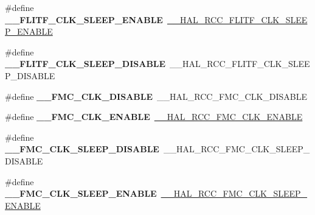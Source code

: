 \begin{DoxyCompactItemize}
\#define {\bfseries \+\_\+\+\_\+\+F\+L\+I\+T\+F\+\_\+\+C\+L\+K\+\_\+\+S\+L\+E\+E\+P\+\_\+\+E\+N\+A\+B\+LE}~\mbox{\hyperlink{group___r_c_c_ex___peripheral___clock___sleep___enable___disable_ga13e370f94b39c72876a321cdc5b31915}{\+\_\+\+\_\+\+H\+A\+L\+\_\+\+R\+C\+C\+\_\+\+F\+L\+I\+T\+F\+\_\+\+C\+L\+K\+\_\+\+S\+L\+E\+E\+P\+\_\+\+E\+N\+A\+B\+LE}}
\item 
\mbox{\label{group___h_a_l___r_c_c___aliased_ga3611eb96ece8835c54951f96d980ae95}} 
\#define {\bfseries \+\_\+\+\_\+\+F\+L\+I\+T\+F\+\_\+\+C\+L\+K\+\_\+\+S\+L\+E\+E\+P\+\_\+\+D\+I\+S\+A\+B\+LE}~\+\_\+\+\_\+\+H\+A\+L\+\_\+\+R\+C\+C\+\_\+\+F\+L\+I\+T\+F\+\_\+\+C\+L\+K\+\_\+\+S\+L\+E\+E\+P\+\_\+\+D\+I\+S\+A\+B\+LE
\item 
\mbox{\label{group___h_a_l___r_c_c___aliased_ga22c7b77b26a0507b21fe61a4e2db31e3}} 
\#define {\bfseries \+\_\+\+\_\+\+F\+M\+C\+\_\+\+C\+L\+K\+\_\+\+D\+I\+S\+A\+B\+LE}~\+\_\+\+\_\+\+H\+A\+L\+\_\+\+R\+C\+C\+\_\+\+F\+M\+C\+\_\+\+C\+L\+K\+\_\+\+D\+I\+S\+A\+B\+LE
\item 
\mbox{\label{group___h_a_l___r_c_c___aliased_ga407951f6eb69ea219ae97f4e00c1b0b0}} 
\#define {\bfseries \+\_\+\+\_\+\+F\+M\+C\+\_\+\+C\+L\+K\+\_\+\+E\+N\+A\+B\+LE}~\mbox{\hyperlink{group___r_c_c_ex___peripheral___clock___enable___disable_ga4f95da0bcb204e40ca556b27290a7541}{\+\_\+\+\_\+\+H\+A\+L\+\_\+\+R\+C\+C\+\_\+\+F\+M\+C\+\_\+\+C\+L\+K\+\_\+\+E\+N\+A\+B\+LE}}
\item 
\mbox{\label{group___h_a_l___r_c_c___aliased_ga9e6ab3878854d53e5d689782e0da6c12}} 
\#define {\bfseries \+\_\+\+\_\+\+F\+M\+C\+\_\+\+C\+L\+K\+\_\+\+S\+L\+E\+E\+P\+\_\+\+D\+I\+S\+A\+B\+LE}~\+\_\+\+\_\+\+H\+A\+L\+\_\+\+R\+C\+C\+\_\+\+F\+M\+C\+\_\+\+C\+L\+K\+\_\+\+S\+L\+E\+E\+P\+\_\+\+D\+I\+S\+A\+B\+LE
\item 
\mbox{\label{group___h_a_l___r_c_c___aliased_ga1a8e1503902302cc5db2c8991e94d1d5}} 
\#define {\bfseries \+\_\+\+\_\+\+F\+M\+C\+\_\+\+C\+L\+K\+\_\+\+S\+L\+E\+E\+P\+\_\+\+E\+N\+A\+B\+LE}~\mbox{\hyperlink{group___r_c_c_ex___peripheral___clock___sleep___enable___disable_ga387cf373f0b77ef8d434a3a6f93bbd11}{\+\_\+\+\_\+\+H\+A\+L\+\_\+\+R\+C\+C\+\_\+\+F\+M\+C\+\_\+\+C\+L\+K\+\_\+\+S\+L\+E\+E\+P\+\_\+\+E\+N\+A\+B\+LE}}

\end{DoxyCompactItemize}
